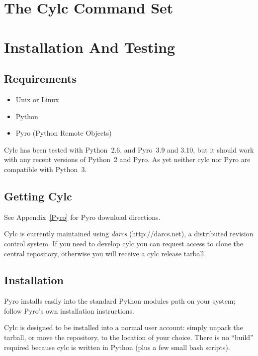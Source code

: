 \documentclass[11pt,a4paper]{article}
\begin{document}
\pagebreak

\section{The Cylc Command Set}
\lstset{language=usage}

\pagebreak

\section{Installation And Testing} 
\label{InstallationAndTesting}

\subsection{Requirements} 
\label{Requirements}

\begin{itemize}
    \item Unix or Linux
    \item Python
    \item Pyro (Python Remote Objects)
\end{itemize}

Cylc has been tested with Python~2.6, and Pyro~3.9 and 3.10,
but it should work with any recent versions of Python~2 and Pyro.
As yet neither cylc nor Pyro are compatible with Python~3. 

\subsection{Getting Cylc} 
\label{GettingCylc}

See Appendix~\ref{Pyro} for Pyro download directions.

Cylc is currently maintained using {\em darcs} (http://darcs.net), a
distributed revision control system. If you need to develop cylc you can
request access to clone the central repository, otherwise you will
receive a cylc release tarball. 

\subsection{Installation} 
\label{Installation}

Pyro installs easily into the standard Python modules path on your
system; follow Pyro's own installation instructions.

Cylc is designed to be installed into a normal user account: simply
unpack the tarball, or move the repository, to the location of your
choice. There is no ``build'' required because cylc is written in Python
(plus a few small bash scripts).
\end{document}
